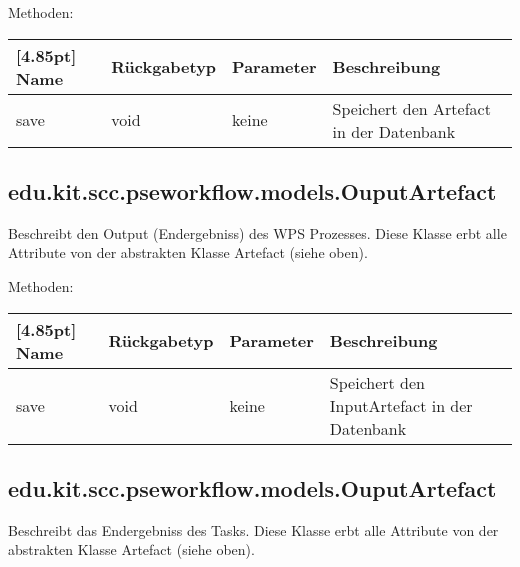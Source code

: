 			Methoden:
			\begin{center}
				\setlength\tabcolsep{5pt}
				\renewcommand{\arraystretch}{1.5}
				
				\begin{tabularx}{\textwidth}{|l|l|l|X|}
					\hline
					\rowcolor[gray]{0.75}[4.85pt]
					Name & Rückgabetyp & Parameter & Beschreibung \\ \hline 
					save & void & keine & Speichert den Artefact in der Datenbank \\
					\hline
				\end{tabularx}
			\end{center}
        \subsection{edu.kit.scc.pseworkflow.models.OuputArtefact}
			Beschreibt den Output (Endergebniss) des WPS Prozesses. \newline
			Diese Klasse erbt alle Attribute von der abstrakten Klasse Artefact (siehe oben).
			
			Methoden:
			\begin{center}
				\setlength\tabcolsep{5pt}
				\renewcommand{\arraystretch}{1.5}
				
				\begin{tabularx}{\textwidth}{|l|l|l|X|}
					\hline
					\rowcolor[gray]{0.75}[4.85pt]
					Name & Rückgabetyp & Parameter & Beschreibung \\ \hline 
				    save & void & keine & Speichert den InputArtefact in der Datenbank \\
					\hline
				\end{tabularx}
			\end{center}
        \subsection{edu.kit.scc.pseworkflow.models.OuputArtefact}
			Beschreibt das Endergebniss des Tasks. \newline
			Diese Klasse erbt alle Attribute von der abstrakten Klasse Artefact (siehe oben).
			
